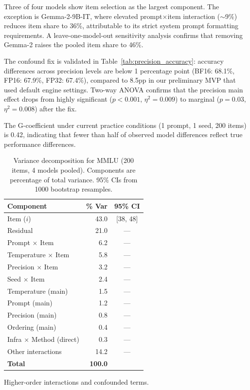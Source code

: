 \documentclass[11pt]{article}
\begin{document}
Three of four models show item selection as the largest component.
The exception is Gemma-2-9B-IT, where elevated prompt$\times$item interaction ($\sim$9\%) reduces item share to 36\%, attributable to its strict system prompt formatting requirements.
A leave-one-model-out sensitivity analysis confirms that removing Gemma-2 raises the pooled item share to 46\%.

The confound fix is validated in Table~\ref{tab:precision_accuracy}: accuracy differences across precision levels are below 1 percentage point (BF16: 68.1\%, FP16: 67.9\%, FP32: 67.4\%), compared to 8.5pp in our preliminary MVP that used default engine settings.
Two-way ANOVA confirms that the precision main effect drops from highly significant ($p < 0.001$, $\eta^2 = 0.009$) to marginal ($p = 0.03$, $\eta^2 = 0.008$) after the fix.

The G-coefficient under current practice conditions (1 prompt, 1 seed, 200 items) is 0.42, indicating that fewer than half of observed model differences reflect true performance differences.

\begin{table}[t]
\centering
\caption{Variance decomposition for MMLU (200 items, 4 models pooled). Components are percentage of total variance. 95\% CIs from 1000 bootstrap resamples.}
\label{tab:mmlu_variance}
\begin{threeparttable}
\begin{tabular}{lrc}
\toprule
\textbf{Component} & \textbf{\% Var} & \textbf{95\% CI} \\
\midrule
Item ($i$) & 43.0 & [38, 48] \\
Residual & 21.0 & --- \\
Prompt $\times$ Item & 6.2 & --- \\
Temperature $\times$ Item & 5.8 & --- \\
Precision $\times$ Item & 3.2 & --- \\
Seed $\times$ Item & 2.4 & --- \\
Temperature (main) & 1.5 & --- \\
Prompt (main) & 1.2 & --- \\
Precision (main) & 0.8 & --- \\
Ordering (main) & 0.4 & --- \\
Infra $\times$ Method (direct) & 0.3 & --- \\
Other interactions\tnote{a} & 14.2 & --- \\
\midrule
\textbf{Total} & \textbf{100.0} & \\
\bottomrule
\end{tabular}
\begin{tablenotes}
\small
\item[a] Higher-order interactions and confounded terms.
\end{tablenotes}
\end{threeparttable}
\end{table}
\end{document}
